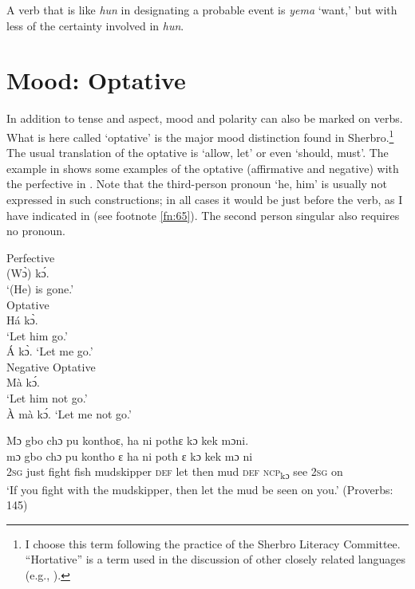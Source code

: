 A verb that is like \textit{hun} in designating a probable event is \textit{yema} ‘want,' but with less of the certainty involved in \textit{hun}.

\section{Mood: Optative} \label{sec:4.4}
\hypertarget{Toc115517785}{}
In addition to tense and aspect, mood and polarity can also be marked on verbs. What is here called ‘optative' is the major mood distinction found in Sherbro.\footnote{I choose this term following the practice of the Sherbro Literacy Committee. “Hortative” is a term used in the discussion of other closely related languages (e.g., \citealt{Childs1995}).} The usual translation of the optative is ‘allow, let' or even ‘should, must'. The example in  shows some examples of the optative (affirmative and negative) with the perfective in . Note that the third-person pronoun ‘he, him' is usually not expressed in such constructions; in all cases it would be just before the verb, as I have indicated in  (see footnote \ref{fn:65}). The second person singular also requires no pronoun.


\ea%
\label{ex:129}
    \ea \label{ex:129a} Perfective\\
    (Wɔ̀) kɔ́.\\
    \glt ‘(He) is gone.'\\

    \ex \label{ex:129b} Optative\\
    Há kɔ̀.\\
    \glt ‘Let him go.'\\
\vspace{6pt}
   Á kɔ̀.
    \glt ‘Let me go.'\\
    
    \ex \label{ex:129c}Negative Optative\\
    Mà kɔ́.\\
    \glt ‘Let him not go.'\\
    \vspace{6pt}
    À mà kɔ́.
    \glt ‘Let me not go.'

\ex \label{ex:129d}Mɔ gbo chɔ pu konthoɛ, ha ni pothɛ kɔ kek mɔni.\\
    \gll mɔ  gbo  chɔ  pu    kontho      ɛ    ha    ni    poth  ɛ    kɔ      kek  mɔ  ni\\
    \textsc{2sg}  just  fight  fish  mudskipper    \textsc{def}  let    then  mud  \textsc{def}  \textsc{ncp}\textsubscript{kɔ}    see  \textsc{2sg}  on\\
    \glt ‘If you fight with the mudskipper, then let the mud be seen on you.' (Proverbs: 145)

